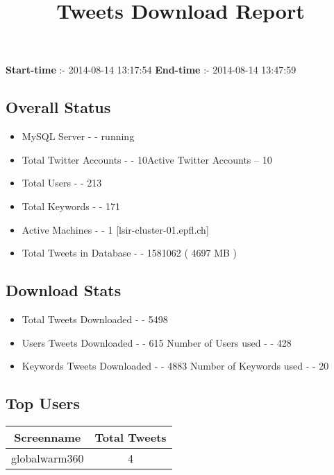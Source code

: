 \documentclass{article}\usepackage[T1]{fontenc}
\begin{document}
\title{\textbf{Tweets Download Report}}
               \date{}
                \maketitle
               \centerline{\textbf{Start-time} :- 2014-08-14 13:17:54 \hspace{40pt} \textbf{End-time} :- 2014-08-14 13:47:59}               \subsection*{Overall Status}                \begin{itemize}                \item MySQL Server - - running               \item Total Twitter Accounts - - 10\newline Active Twitter Accounts -- 10               \item Total Users - - 213               \item Total Keywords - - 171               \item Active Machines - - 1 [lsir-cluster-01.epfl.ch]               \item Total Tweets in Database - - 1581062 ( 4697 MB )               \end{itemize}               \subsection*{Download Stats}                \begin{itemize}                \item Total Tweets Downloaded - - 5498               \item Users Tweets Downloaded - - 615 \newline Number of Users used - - 428               \item Keywords Tweets Downloaded - - 4883 \newline Number of Keywords used - - 20              \end{itemize}              \subsection*{Top Users}\begin{tabular}{|c|c|}         \hline         Screenname & Total Tweets \\ 
 \hline
globalwarm360 & 4\\ 
 \hline

\end{tabular}
\end{document}
